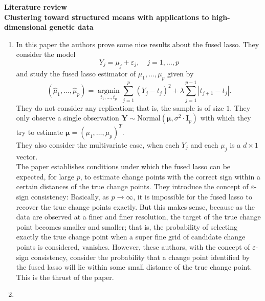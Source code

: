 \documentclass[10pt]{article}
\newcommand{\bl}{\textcolor{blue}}
\begin{document}


\begin{center}
{\bf  {\large Literature review} \\
\vspace{12pt}
Clustering toward structured means with applications to high-dimensional genetic data}
\end{center}

\begin{enumerate}
 \item \bl{}
    
    In this paper the authors prove some nice results about the fused lasso.  They consider the model
    \[
    Y_j = \mu_j + \varepsilon_j,\quad j = 1,\dots,p
    \]
    and study the fused lasso estimator of $\mu_1,\dots,\mu_p$ given by
    \[
    (\hat \mu_1,\dots,\hat \mu_p) = \underset{t_1,\dots,t_p}{\operatorname{argmin}} \sum_{j=1}^p (Y_j - t_j)^2 + \lambda \sum_{j=1}^{p-1}|t_{j+1} - t_j|.
    \]
    They do not consider any replication; that is, the sample is of size $1$.  They only observe a single observation $\mathbf{Y} \sim \text{Normal}(\boldsymbol{\mu},\sigma^2\cdot \mathbf{I}_p)$ with which they try to estimate $\boldsymbol{\mu} = (\mu_1,\dots,\mu_p)^T$.\\
    
    They also consider the multivariate case, when each $Y_j$ and each $\mu_j$ is a $d \times 1$ vector.\\
    
    The paper establishes conditions under which the fused lasso can be expected, for large $p$, to estimate change points with the correct sign within a certain distances of the true change points. They introduce the concept of $\varepsilon$-sign consistency: Basically, as $p \to \infty$, it is impossible for the fused lasso to recover the true change points exactly.  But this makes sense, because as the data are observed at a finer and finer resolution, the target of the true change point becomes smaller and smaller; that is, the probability of selecting exactly the true change point when a super fine grid of candidate change points is considered, vanishes.  However, these authors, with the concept of $\varepsilon$-sign consistency, consider the probability that a change point identified by the fused lasso will lie within some small distance of the true change point.  This is the thrust of the paper.
    
    
    \item \bl{}
    

\end{enumerate}
\end{document}
